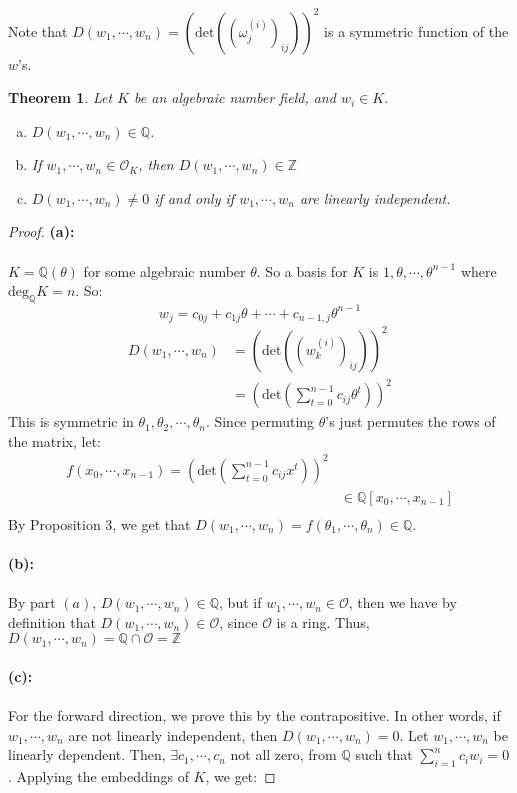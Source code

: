 \documentclass{article}
\newcommand{\Q}{\mathbb{Q}}
\newcommand{\Z}{\mathbb{Z}}
\newtheorem{theorem}{Theorem}
\begin{document}
\noindent Note that $D(w_1,\cdots ,w_n)=(\text{det}((\omega_j^{(i)})_{ij}))^2$ is a symmetric function of the $w$'s.
\begin{theorem}
Let $K$ be an algebraic number field, and $w_i\in K$.
\begin{enumerate}[(a)]
    \item $D(w_1,\cdots, w_n)\in\Q$.
    \item If $w_1,\cdots, w_n\in \mathcal{O}_K$, then $D(w_1,\cdots ,w_n)\in\Z$
    \item $D(w_1,\cdots, w_n)\neq 0$ if and only if $w_1,\cdots, w_n$ are linearly independent.
\end{enumerate}
\end{theorem}
\begin{proof}
\textbf{(a):}\\
\\
$K=\Q(\theta)$ for some algebraic number $\theta$. So a basis for $K$ is $1,\theta, \cdots ,\theta^{n-1}$ where $\text{deg}_\Q K=n$. So:
$$w_j=c_{0j}+c_{1j}\theta+ \cdots + c_{n-1,j}\theta^{n-1}$$
\begin{align*}
    D(w_1,\cdots ,w_n)&=(\text{det}((w_k^{(i)})_{ij}))^2\\
    &=(\text{det}\left(\sum_{t=0}^{n-1}c_{ij}\theta^t\right))^2
\end{align*}
This is symmetric in $\theta_1,\theta_2,\cdots ,\theta_n$. Since permuting $\theta$'s just permutes the rows of the matrix, let:
\begin{align*}
    f(x_0,\cdots ,x_{n-1})=(\text{det}\left(\sum_{t=0}^{n-1}c_{ij}x^t\right))^2\\
    &\in \Q[x_0,\cdots ,x_{n-1}]\\
\end{align*}
By Proposition 3, we get that $D(w_1,\cdots , w_n)=f(\theta_1,\cdots ,\theta_n)\in\Q$.\\
\\
\textbf{(b):}\\
\\
By part $(a)$, $D(w_1,\cdots , w_n)\in\Q$, but if $w_1,\cdots , w_n\in\mathcal{O}$, then we have by definition that $D(w_1,\cdots ,w_n)\in\mathcal{O}$, since $\mathcal{O}$ is a ring. Thus, $D(w_1,\cdots ,w_n)=\Q\cap \mathcal{O} = \Z$\\
\\
\textbf{(c):}\\
\\
For the forward direction, we prove this by the contrapositive. In other words, if $w_1,\cdots ,w_n$ are not linearly independent, then $D(w_1,\cdots ,w_n)=0$. Let $w_1,\cdots ,w_n$ be linearly dependent. Then, $\exists c_1,\cdots ,c_n$ not all zero, from $\Q$ such that $\displaystyle\sum_{i=1}^nc_iw_i=0$. Applying the embeddings of $K$, we get:

\end{proof}
\end{document}
